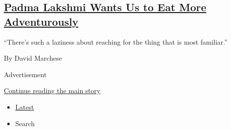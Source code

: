 \begin{enumerate}
  \hypertarget{padma-lakshmi-wants-us-to-eat-more-adventurously}{%
  \subsection{\texorpdfstring{\href{/interactive/2020/08/03/magazine/padma-lakshmi-interview.html}{Padma
  Lakshmi Wants Us to Eat More
  Adventurously}}{Padma Lakshmi Wants Us to Eat More Adventurously}}\label{padma-lakshmi-wants-us-to-eat-more-adventurously}}

  ``There's such a laziness about reaching for the thing that is most
  familiar.''

  By David Marchese
\end{enumerate}

Advertisement

\protect\hyperlink{after-mid1}{Continue reading the main story}

\begin{itemize}
\tightlist
\item
  \protect\hyperlink{stream-panel}{Latest}
\item
  Search
\end{itemize}

